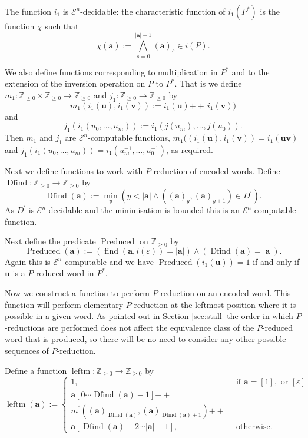\documentclass[a4paper]{article}
\newcommand{\grz}[1]{$\mathcal{E}^{#1}$}	%
\newcommand{\ZZ}{\mathbb{Z}}
\newcommand{\maps}{\longrightarrow}
\newcommand\eps{\varepsilon}
\newcommand{\avec}{\mathbf{a}}	%
\newcommand{\uvec}{\mathbf{u}}	%
\newcommand{\vvec}{\mathbf{v}}	%
\newcommand{\concat}{\ensuremath{+\!\!\!\!+\,}}	%
\newcommand{\find}{\operatorname{find}}
\newcommand{\Dfind}{\operatorname{Dfind}}
\newcommand{\Preduced}{\operatorname{Preduced}}
\newcommand{\leftm}{\operatorname{leftm}}
\theoremstyle{plain}
\theoremstyle{definition}
\begin{document}
The function $i_1$ is 
 \grz{n}-decidable: the characteristic function of $i_1(P^*)$ is the function 
$\chi$ such that 
\[\chi(\avec):=\displaystyle{\bigwedge_{s=0}^{|\avec|-1}}(\avec)_s \in i(P).\]  

We also define functions corresponding to multiplication in $P^*$  and to the extension of the inversion
operation on $P$ to $P^*$. That is we define $m_1:\ZZ_{\geq 0}\times\ZZ_{\geq 0}\maps \ZZ_{\geq 0}$ and $j_1:\ZZ_{\geq 0}\maps \ZZ_{\geq 0}$ by
\begin{equation}\label{eq:mmonoid}
m_1(i_1(\uvec),i_1(\vvec)):=i_1(\uvec)\concat i_1(\vvec)) 
\end{equation}
and 
\begin{equation}\label{eq:jmonoid}
j_1(i_1(u_0,\ldots, u_m)):=i_1(j(u_m),\ldots ,j(u_0)). 
\end{equation}
Then $m_1$ and $j_1$ are \grz{n}-computable functions, $m_1((i_1(\uvec),i_1(\vvec))=i_1(\uvec\vvec)$ 
and $j_1(i_1(u_0,\ldots, u_m))=i_1(u_m^{-1},\ldots , u_0^{-1})$, as required.

Next we define functions to work with $P$-reduction of encoded words.
Define $\Dfind:\ZZ_{\geq 0}\maps \ZZ_{\geq 0}$ by 
\begin{equation}\label{eq:Dfind}
\Dfind(\avec):=\min_y(y<|\avec|\wedge ((\avec)_y,(\avec)_{y+1})\in D^\prime).
\end{equation}
As $D^\prime$ is \grz{n}-decidable and the minimisation is bounded this is
an \grz{n}-computable function. 

Next define the predicate $\Preduced$ on $\ZZ_{\geq 0}$ by
\begin{equation}\label{eq:Preduced}
\Preduced(\avec):=\left(\find(\avec,i(\eps))=|\avec|\right)\wedge
\left( \Dfind(\avec)=|\avec|\right).
\end{equation} 
Again this is \grz{n}-computable and we have $\Preduced(i_1(\uvec))=1$ if and 
only if $\uvec$ is a $P$-reduced word in $P^\ast$. 

Now we construct a function to perform $P$-reduction on an encoded word. This
function will perform elementary $P$-reduction at the leftmost position where
it is possible in a given word. As pointed out in Section \ref{sec:stall} the
order in which $P$-reductions are performed does not affect the equivalence
class of the $P$-reduced word that is produced, so there will be no need to
consider any other possible  sequences of $P$-reduction. 

Define a function $\leftm:\ZZ_{\geq 0}\maps \ZZ_{\geq 0}$ by
\begin{equation}\label{eq:leftm}
\leftm(\avec):=
\left\{
\begin{array}{ll}
1,& \textrm{ if } \avec = [1], \textrm{ or } [\eps]\\
\avec[0\cdots \Dfind(\avec)-1]\concat &\\
m^\prime((\avec)_{\Dfind(\avec)},(\avec)_{\Dfind(\avec)+1})\concat&\\
\avec[\Dfind(\avec)+2\cdots |\avec|-1] ,& \textrm{ otherwise. } 
\end{array}
\right.
\end{equation}
\end{document}
